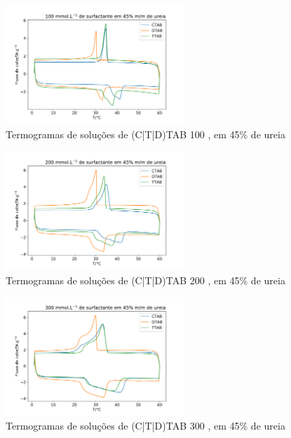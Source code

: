 		
		\begin{figure}[H]
			\centering
			\includegraphics[width=0.60\textwidth]{./imagens/dsc/Surf_100mm_45p}
			\caption{Termogramas de soluções de (C|T|D)TAB 100 \mM{}, em 45\% de ureia}
			\label{fig:DSC_Surf_100mm_45p}
		\end{figure}
	
		\begin{figure}[H]
			\centering
			\includegraphics[width=0.60\textwidth]{./imagens/dsc/Surf_200mm_45p}
			\caption{Termogramas de soluções de (C|T|D)TAB 200 \mM{}, em 45\% de ureia}
			\label{fig:DSC_Surf_200mm_45p}
		\end{figure}
	
		\begin{figure}[H]
			\centering
			\includegraphics[width=0.60\textwidth]{./imagens/dsc/Surf_300mm_45p}
			\caption{Termogramas de soluções de (C|T|D)TAB 300 \mM{}, em 45\% de ureia}
			\label{fig:DSC_Surf_300mm_45p}
		\end{figure}
	
